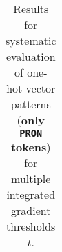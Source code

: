 \begin{table}[t]
\begin{tabular}{lllllll}

\hline
\end{tabular}
\caption[Model Evaluation for only \texttt{PRON} tokens]{Results for systematic evaluation of one-hot-vector patterns (\textbf{only \texttt{PRON} tokens}) for multiple integrated gradient thresholds $t$.}
\label{tab:evalResultsPRON}
\end{table}
	